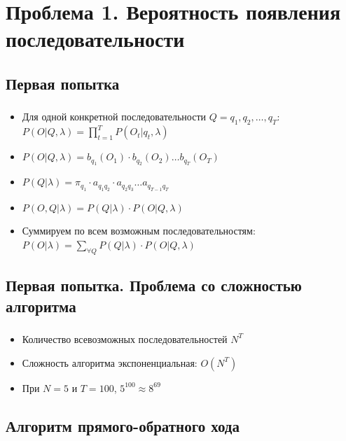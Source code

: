 \documentclass{beamer}
\begin{document}
\section{Проблема 1. Вероятность появления последовательности}
\subsection{Первая попытка}

\begin{frame}
  \frametitle{\insertsection}
  \framesubtitle{\insertsubsection}
  \begin{itemize}
  \item Для одной конкретной последовательности $Q = q_1, q_2, \ldots, q_T$: \\ $\displaystyle P(O | Q, \lambda) = \prod_{t = 1}^{T} P(O_t | q_t, \lambda)$
    \pause
  \item $\displaystyle P(O | Q, \lambda) = b_{q_1}(O_1) \cdot b_{q_2}(O_2) \ldots b_{q_T}(O_T)$ \pause
  \item $\displaystyle P(Q | \lambda) = \pi_{q_1} \cdot a_{q_1q_2} \cdot a_{q_2q_3} \ldots a_{q_{T - 1}q_T}$ \pause
  \item $\displaystyle P(O, Q | \lambda) = P(Q | \lambda) \cdot P(O | Q, \lambda)$
    \pause
  \item Суммируем по всем возможным последовательностям: $\displaystyle P(O | \lambda) = \sum_{\forall Q} P(Q | \lambda) \cdot P(O | Q, \lambda)$
  \end{itemize}
\end{frame}

\subsection{Первая попытка. Проблема со сложностью алгоритма}

\begin{frame}
  \frametitle{\insertsection}
  \framesubtitle{\insertsubsection}
  \begin{itemize}
  \item Количество всевозможных последовательностей $N^T$ \pause
  \item Сложность алгоритма экспоненциальная: $O(N^T)$
  \item При $N = 5$ и  $T = 100$, $5^{100} \approx 8^{69}$
  \end{itemize}
\end{frame}

\subsection{Алгоритм прямого-обратного хода}
\end{document}

